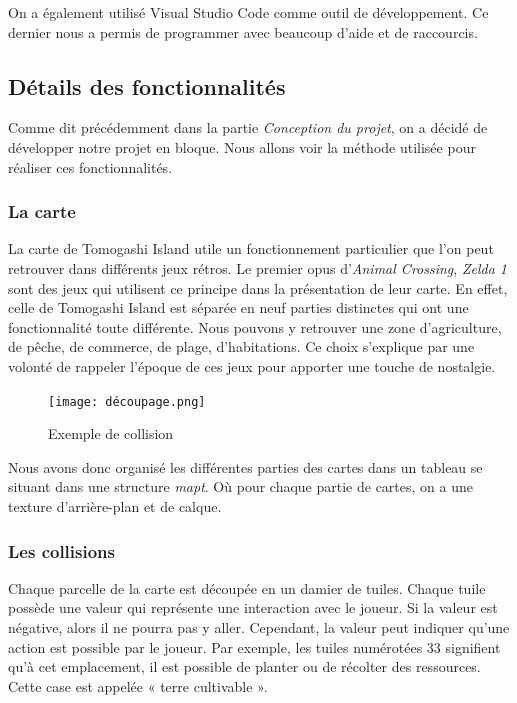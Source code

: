 \documentclass{article}
\begin{document}
    On a également utilisé Visual Studio Code comme outil de développement. Ce dernier nous a permis de programmer avec beaucoup d'aide et de raccourcis. 

    
    \subsection{Détails des fonctionnalités}
        Comme dit précédemment dans la partie \textit{Conception du projet}, on a décidé de développer notre projet en bloque. Nous allons voir la méthode utilisée pour réaliser ces fonctionnalités.
\subsubsection{La carte}
La carte de Tomogashi Island utile un fonctionnement particulier que l’on peut retrouver dans différents jeux rétros. Le premier opus d’\textit{Animal Crossing}, \textit{Zelda 1} sont des jeux qui utilisent ce principe dans la présentation de leur carte. En effet, celle de Tomogashi Island est séparée en neuf parties distinctes qui ont une fonctionnalité toute différente. Nous pouvons y retrouver une zone d’agriculture, de pêche, de commerce, de plage, d'habitations. Ce choix s'explique par une volonté de rappeler l'époque de ces jeux pour apporter une touche de nostalgie.

        \begin{figure}[!h]  
            \texttt{[image: découpage.png]}
            \centering
            \caption{Exemple de collision}
            \label{fig:collions}
        \end{figure}

        Nous avons donc organisé les différentes parties des cartes dans un tableau se situant dans une structure \textit{map\textunderscore t}. Où pour chaque partie de cartes, on a une texture d'arrière-plan et de calque.
         
\subsubsection{Les collisions}
Chaque parcelle de la carte est découpée en un damier de tuiles. Chaque tuile possède une valeur qui représente une interaction avec le joueur. Si la valeur est négative, alors il ne pourra pas y aller. Cependant, la valeur peut indiquer qu'une action est possible par le joueur. Par exemple, les tuiles numérotées 33 signifient qu'à cet emplacement, il est possible de planter ou de récolter des ressources. Cette case est appelée « terre cultivable ».
\end{document}
